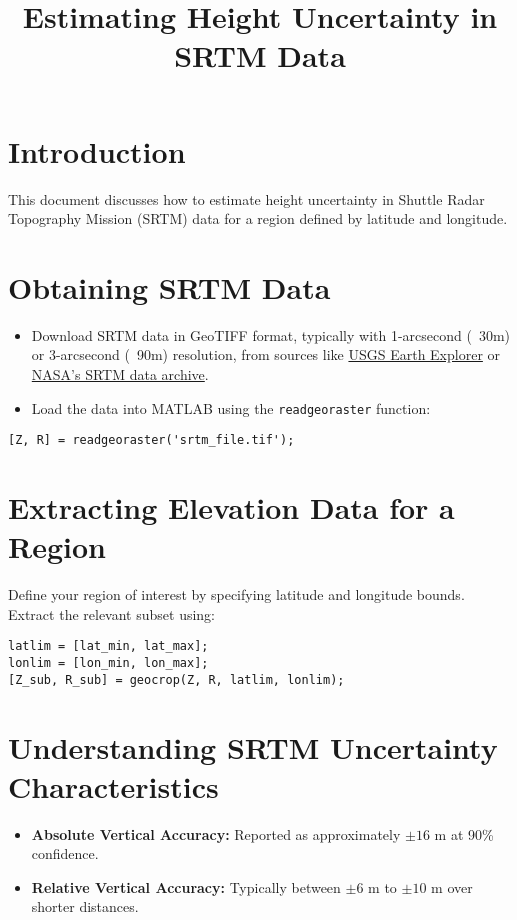 \documentclass{article}
\title{Estimating Height Uncertainty in SRTM Data}
\author{}
\date{}
\begin{document}
\maketitle

\section{Introduction}
This document discusses how to estimate height uncertainty in Shuttle Radar Topography Mission (SRTM) data for a region defined by latitude and longitude. 

\section{Obtaining SRTM Data}
\begin{itemize}
    \item Download SRTM data in GeoTIFF format, typically with 1-arcsecond (~30m) or 3-arcsecond (~90m) resolution, from sources like \href{https://earthexplorer.usgs.gov/}{USGS Earth Explorer} or \href{https://doi.org/10.5067/MEaSUREs/SRTM/SRTMGL1.003}{NASA’s SRTM data archive}.
    \item Load the data into MATLAB using the \texttt{readgeoraster} function:
\end{itemize}

\begin{verbatim}
[Z, R] = readgeoraster('srtm_file.tif');
\end{verbatim}

\section{Extracting Elevation Data for a Region}
Define your region of interest by specifying latitude and longitude bounds. Extract the relevant subset using:

\begin{verbatim}
latlim = [lat_min, lat_max];
lonlim = [lon_min, lon_max];
[Z_sub, R_sub] = geocrop(Z, R, latlim, lonlim);
\end{verbatim}

\section{Understanding SRTM Uncertainty Characteristics}
\begin{itemize}
    \item \textbf{Absolute Vertical Accuracy:} Reported as approximately $\pm 16$ m at 90\% confidence.
    \item \textbf{Relative Vertical Accuracy:} Typically between $\pm 6$ m to $\pm 10$ m over shorter distances.
\end{itemize}
\end{document}
